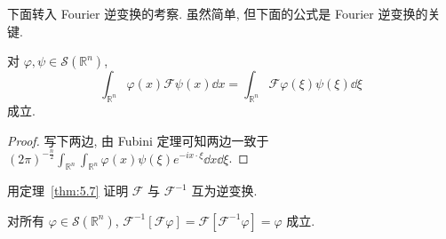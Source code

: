 下面转入 Fourier 逆变换的考察. 虽然简单, 但下面的公式是 Fourier 逆变换的关键.

\begin{theorem}\label{thm:5.7}
对 $\varphi, \psi \in \mathcal{S}(\mathbb{R}^{n})$,
\begin{equation}\tag{5.10}
\int_{\mathbb{R}^{n}}\varphi(x)\mathcal{F}\psi(x)\dd x = \int_{\mathbb{R}^{n}}\mathcal{F}\varphi(\xi)\psi(\xi)\dd \xi
\label{eq:5.10}
\end{equation}
成立.
\end{theorem}

\begin{proof}
写下两边, 由 Fubini 定理可知两边一致于 $(2\pi)^{-\frac{n}{2}}\int_{\mathbb{R}^{n}}\int_{\mathbb{R}^{n}}\varphi(x)\psi(\xi)e^{-ix \cdot \xi}\dd x\dd \xi$.
\end{proof}

用定理~\ref{thm:5.7} 证明 $\mathcal{F}$ 与 $\mathcal{F}^{-1}$ 互为逆变换.

\begin{theorem}\label{thm:5.8}
对所有 $\varphi \in \mathcal{S}(\mathbb{R}^{n})$, $\mathcal{F}^{-1}[\mathcal{F}\varphi] = \mathcal{F}[\mathcal{F}^{-1}\varphi] = \varphi$ 成立.
\end{theorem}

